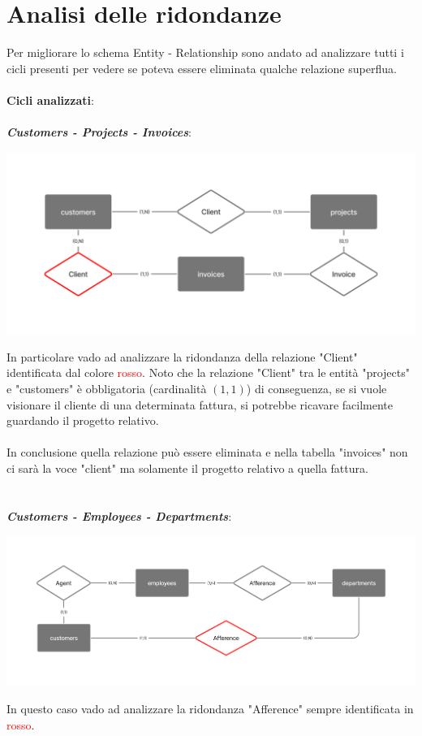 \documentclass[12pt,a4paper]{article}
\begin{document}
\section{Analisi delle ridondanze}\label{sec:analisi-delle-ridondanze}
Per migliorare lo schema Entity - Relationship sono andato ad analizzare tutti i cicli presenti per vedere se poteva essere eliminata qualche relazione superflua.\\
\\
\textbf{Cicli analizzati}:\\
\\
\textbf{\textit{Customers - Projects - Invoices}}:
\begin{center}
\includegraphics[width=0.6\columnwidth]{../../img/er_cycle_custumers-projects-invoices}
\end{center}
In particolare vado ad analizzare la ridondanza della relazione "Client" identificata dal colore \textcolor{red}{rosso}.
Noto che la relazione "Client" tra le entità "projects" e "customers" è obbligatoria (cardinalità $(1,1)$) di conseguenza, se si vuole visionare il cliente di una determinata fattura, si potrebbe ricavare facilmente guardando il progetto relativo.\\
\\
In conclusione quella relazione può essere eliminata e nella tabella "invoices" non ci sarà la voce "client" ma solamente il progetto relativo a quella fattura.\\
\\
\\
\textbf{\textit{Customers - Employees - Departments}}:
\begin{center}
\includegraphics[width=0.6\columnwidth]{../../img/er_cycle_customers-employees-departments}
\end{center}
In questo caso vado ad analizzare la ridondanza "Afference" sempre identificata in \textcolor{red}{rosso}.
\end{document}
